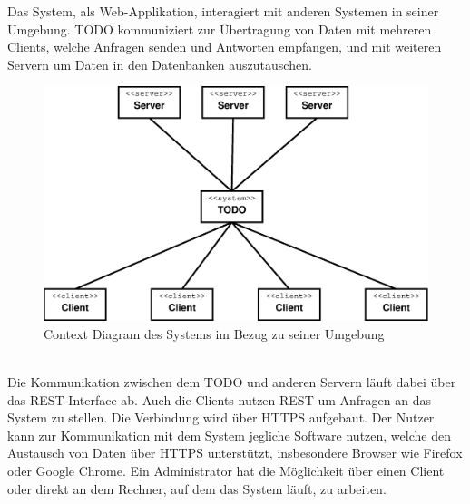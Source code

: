 Das System, als Web-Applikation, interagiert mit anderen Systemen in seiner Umgebung. TODO kommuniziert zur Übertragung von Daten mit mehreren Clients, welche Anfragen senden und Antworten empfangen, und mit weiteren Servern um Daten in den Datenbanken auszutauschen.\\
\begin{figure}[h]
	\vspace{-10pt}
\centering
\includegraphics[width=0.9\linewidth]{Grafik/Diagramm/External}
\caption[Context Diagram]{Context Diagram des Systems im Bezug zu seiner Umgebung}
\label{fig:External}
\end{figure}\\
Die Kommunikation zwischen dem TODO und anderen Servern läuft dabei über das REST-Interface ab. Auch die Clients nutzen REST um Anfragen an das System zu stellen. Die Verbindung wird über HTTPS aufgebaut. Der Nutzer kann zur Kommunikation mit dem System jegliche Software nutzen, welche den Austausch von Daten über HTTPS unterstützt, insbesondere Browser wie Firefox oder Google Chrome. Ein Administrator hat die Möglichkeit über einen Client oder direkt an dem Rechner, auf dem das System läuft, zu arbeiten.